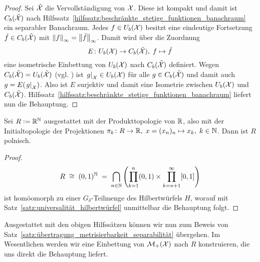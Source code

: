 \documentclass[../main/main.tex]{subfiles}
\begin{document}
	\begin{proof}
		Sei $\tilde{\mathcal{X}}$ die Vervollständigung von $\mathcal{X}$. Diese ist kompakt und damit ist $C_b(\tilde{\mathcal{X}})$ nach Hilfssatz~\ref{hilfssatz:beschränkte_stetige_funktionen_banachraum} ein separabler Banachraum.
		Jedes $f \in U_b(\mathcal{X})$ besitzt eine eindeutige Fortsetzung $\tilde{f} \in C_b(\tilde{\mathcal{X}})$ mit $\left\lVert f\right\rVert_\infty = \left\lVert\tilde{f}\right\rVert_\infty$. Damit wird über die Zuordnung
		\[ E \colon U_b(\mathcal{X}) \to C_b(\tilde{\mathcal{X}}), \; f \mapsto \tilde{f}  \]
		eine isometrische Einbettung von $U_b(\mathcal{X})$ nach $C_b(\tilde{\mathcal{X}})$ definiert. 
		Wegen $C_b(\tilde{\mathcal{X}}) = U_b(\tilde{\mathcal{X}})$ (vgl. \cite[Satz 2.4.1]{Simon.2015}) ist $\left.g\right|_{\mathcal{X}} \in U_b(\mathcal{X})$ für alle $g \in C_b(\tilde{\mathcal{X}})$ und damit
		auch $g = E(\left.g\right|_{\mathcal{X}})$. Also ist $E$ surjektiv und damit eine Isometrie zwischen $U_b(\mathcal{X})$ und $C_b(\tilde{\mathcal{X}})$. Hilfssatz~\ref{hilfssatz:beschränkte_stetige_funktionen_banachraum} liefert nun die Behauptung.
	\end{proof}
	
	\begin{Hilfssatz}
		\label{hilfssatz:einbettungsraum_R}
		Sei $R \vcentcolon = \mathbb{R}^{\mathbb{N}}$ ausgestattet mit der Produkttopologie von $\mathbb{R}$, also mit der Initialtopologie der Projektionen $\pi_k \colon R \to \mathbb{R}, \; x = (x_n)_n \mapsto x_k , \; k \in \mathbb{N}$. Dann ist $R$ 
		polnisch.
	\end{Hilfssatz}
	
	\begin{proof}
		\[R \; \cong \; (0, 1)^{\mathbb{N}} \; = \; \bigcap_{n \in \mathbb{N}}  \left( \prod_{k=1}^{n} (0, 1) \times \prod_{k=n+1}^{\infty} [0,1] \right) \]
		ist homöomorph zu einer $G_\delta$-Teilmenge des Hilbertwürfels $H$, worauf mit Satz~\ref{satz:universalität_hilbertwürfel} unmittelbar die Behauptung folgt.
	\end{proof}

	Ausgestattet mit den obigen Hilfssätzen können wir nun zum Beweis von Satz~\ref{satz:übertragung_metrisierbarkeit_separabilität} übergehen. Im Wesentlichen werden wir eine Einbettung von $\mathcal{M}_{+}(\mathcal{X})$ nach $R$ konstruieren, die uns direkt die Behauptung liefert.
	
\end{document}
